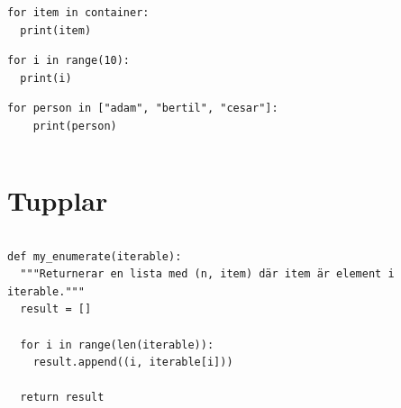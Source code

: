 \begin{frame}[fragile]
  \begin{verbatim}
for item in container:
  print(item)
  \end{verbatim}
\end{frame}

\begin{frame}[fragile]
  \begin{example}
    \begin{verbatim}
for i in range(10):
  print(i)
    \end{verbatim}
  \end{example}
\end{frame}

\begin{frame}[fragile]
  \begin{example}
    \begin{verbatim}
for person in ["adam", "bertil", "cesar"]:
    print(person)
    \end{verbatim}
  \end{example}
\end{frame}

\begin{frame}[fragile]
  \begin{example}
    \inputminted{python}{examples/phone-for.py}
  \end{example}
\end{frame}



\section{Tupplar}

\begin{frame}[fragile]
  \begin{example}[tuples.py]
    \inputminted{python}{examples/tuples.py}
  \end{example}

  \pause

  \begin{example}
    \begin{verbatim}
def my_enumerate(iterable):
  """Returnerar en lista med (n, item) där item är element i iterable."""
  result = []

  for i in range(len(iterable)):
    result.append((i, iterable[i]))

  return result
    \end{verbatim}
  \end{example}
\end{frame}

